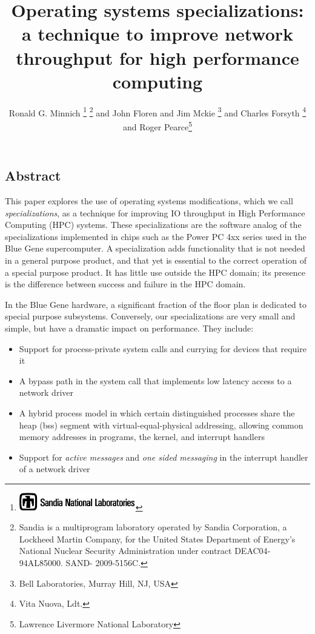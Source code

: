 \documentclass[letterpaper,twocolumn,10pt]{article}
\date{}
\begin{document}
\author{Ronald G. Minnich%
\thanks{\protect\includegraphics[height=0.3in]{thunderchicken}%
}%
\thanks{Sandia is a multiprogram laboratory operated by Sandia Corporation, a Lockheed Martin Company, for the United States Department of Energy’s National Nuclear Security Administration under contract DE­AC04­94AL85000. SAND- 2009-5156C.}  and John Floren and Jim Mckie
\thanks{Bell Laboratories, Murray Hill, NJ, USA }
 and Charles Forsyth
\thanks{Vita Nuova, Ldt.} and Roger Pearce\thanks{Lawrence Livermore National Laboratory}
}
\title{\Large \bf Operating systems specializations: a technique to improve network  throughput for high performance computing}
\maketitle
\thispagestyle{empty}
\pagestyle{empty}
\subsection*{Abstract}
This paper explores the use of operating systems modifications, which we call {\em specializations}, as a technique for improving IO throughput in High Performance Computing (HPC) systems. 
These specializations are the software analog of the specializations implemented in chips such as the Power PC 4xx series used in the Blue Gene supercomputer. A 
specialization adds functionality that is not needed in a general purpose product, and that yet is essential to the correct operation of a special purpose product. It has  little use 
outside the HPC domain; its presence is the difference between success and failure in the HPC domain. 

In the Blue Gene hardware, a significant fraction of the floor plan is dedicated to special purpose subsystems. Conversely, our specializations are very small and simple, but have a dramatic impact on performance. 
They include: 
\begin{itemize}
\item Support for process-private system calls and currying for devices that require it
\item A bypass path in the system call that implements low latency access to a network driver
\item A hybrid process model in which certain distinguished processes share the heap (bss) segment with virtual-equal-physical addressing, allowing common memory addresses in programs, the kernel, and interrupt handlers
\item Support for {\em active messages} and {\em one sided messaging} in the interrupt handler of a network driver
\end{itemize}
\end{document}
